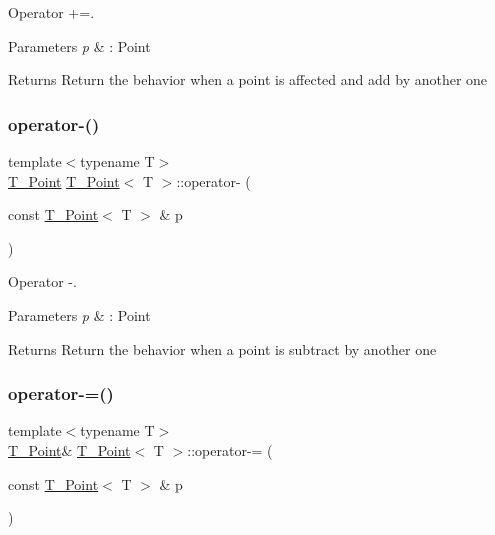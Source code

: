 Operator +=. 


\begin{DoxyParams}{Parameters}
{\em p} & \+: Point \\
\hline
\end{DoxyParams}
\begin{DoxyReturn}{Returns}
Return the behavior when a point is affected and add by another one 
\end{DoxyReturn}
\mbox{\label{classT__Point_a4a3671d0a9763b3e749c799294ebb1ca}} 
\subsubsection{\texorpdfstring{operator-\/()}{operator-()}}
{\footnotesize\ttfamily template$<$typename T$>$ \\
\hyperlink{classT__Point}{T\+\_\+\+Point} \hyperlink{classT__Point}{T\+\_\+\+Point}$<$ T $>$\+::operator-\/ (\begin{DoxyParamCaption}\item[{const \hyperlink{classT__Point}{T\+\_\+\+Point}$<$ T $>$ \&}]{p }\end{DoxyParamCaption})\hspace{0.3cm}{\ttfamily [inline]}}



Operator -\/. 


\begin{DoxyParams}{Parameters}
{\em p} & \+: Point \\
\hline
\end{DoxyParams}
\begin{DoxyReturn}{Returns}
Return the behavior when a point is subtract by another one 
\end{DoxyReturn}
\mbox{\label{classT__Point_aa438de3090999e1f24f0de58dc5171a0}} 
\subsubsection{\texorpdfstring{operator-\/=()}{operator-=()}}
{\footnotesize\ttfamily template$<$typename T$>$ \\
\hyperlink{classT__Point}{T\+\_\+\+Point}\& \hyperlink{classT__Point}{T\+\_\+\+Point}$<$ T $>$\+::operator-\/= (\begin{DoxyParamCaption}\item[{const \hyperlink{classT__Point}{T\+\_\+\+Point}$<$ T $>$ \&}]{p }\end{DoxyParamCaption})\hspace{0.3cm}{\ttfamily [inline]}}



